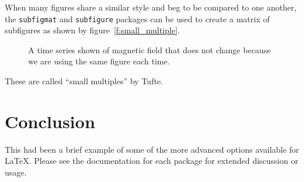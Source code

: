 \documentclass[draft]{aiaa-tc}%
\newcommand{\package}[1]{\texttt{#1}}
\begin{document}
When many figures share a similar style and beg to be compared to one
another, the \package{subfigmat} and \package{subfigure} packages can be
used to create a matrix of subfigures as shown by
figure~\vref{f:small_multiple}.
\begin{figure}
 \begin{subfigmatrix}{4}%
 \end{subfigmatrix}
 \caption{A time series shown of magnetic field that does not change
          because we are using the same figure each time.}
 \label{f:small_multiple}
\end{figure}
These are called ``small multiples'' by Tufte.

\section{Conclusion}

This had been a brief example of some of the more advanced options
available for \LaTeX.
Please see the documentation for each package for extended discussion or
usage.



\end{document}
